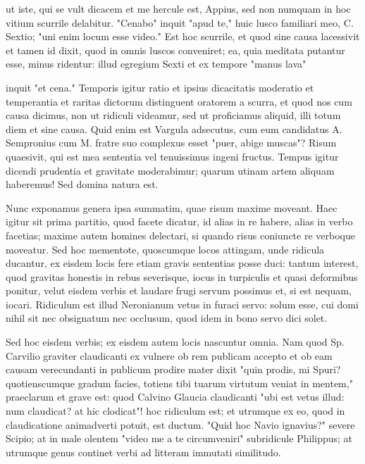  ut iste, qui se vult dicacem et me hercule est, Appius, sed non numquam in hoc vitium scurrile delabitur. "Cenabo" inquit "apud te," huic lusco familiari meo, C. Sextio; "uni enim locum esse video." Est hoc scurrile, et quod sine causa lacessivit et tamen id dixit, quod in omnis luscos conveniret; ea, quia meditata putantur esse, minus ridentur: illud egregium Sexti et ex tempore "manus lava"

 inquit "et cena." Temporis igitur ratio et ipsius dicacitatis moderatio et temperantia et raritas dictorum distinguent oratorem a scurra, et quod nos cum causa dicimus, non ut ridiculi videamur, sed ut proficiamus aliquid, illi totum diem et sine causa. Quid enim est Vargula adsecutus, cum eum candidatus A. Sempronius cum M. fratre suo complexus esset "puer, abige muscas"? Risum quaesivit, qui est mea sententia vel tenuissimus ingeni fructus. Tempus igitur dicendi prudentia et gravitate moderabimur; quarum utinam artem aliquam haberemus! Sed domina natura est.

 Nunc exponamus genera ipsa summatim, quae risum maxime moveant. Haec igitur sit prima partitio, quod facete dicatur, id alias in re habere, alias in verbo facetias; maxime autem homines delectari, si quando risus coniuncte re verboque moveatur. Sed hoc mementote, quoscumque locos attingam, unde ridicula ducantur, ex eisdem locis fere etiam gravis sententias posse duci: tantum interest, quod gravitas honestis in rebus severisque, iocus in turpiculis et quasi deformibus ponitur, velut eisdem verbis et laudare frugi servum possimus et, si est nequam, iocari. Ridiculum est illud Neronianum vetus in furaci servo: solum esse, cui domi nihil sit nec obsignatum nec occlusum, quod idem in bono servo dici solet.

 Sed hoc eisdem verbis; ex eisdem autem locis nascuntur omnia. Nam quod Sp. Carvilio graviter claudicanti ex vulnere ob rem publicam accepto et ob eam causam verecundanti in publicum prodire mater dixit "quin prodis, mi Spuri? quotienscumque gradum facies, totiens tibi tuarum virtutum veniat in mentem," praeclarum et grave est: quod Calvino Glaucia claudicanti "ubi est vetus illud: num claudicat? at hic clodicat"! hoc ridiculum est; et utrumque ex eo, quod in claudicatione animadverti potuit, est ductum. "Quid hoc Navio ignavius?" severe Scipio; at in male olentem "video me a te circumveniri" subridicule Philippus; at utrumque genus continet verbi ad litteram immutati similitudo.

